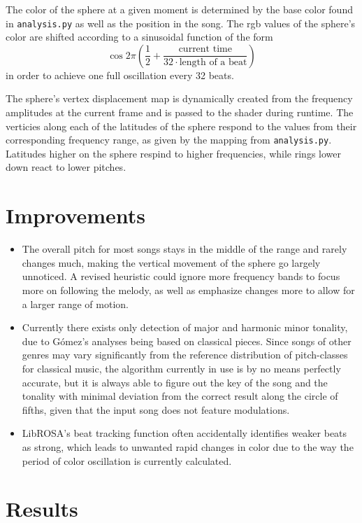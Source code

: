 \documentclass{article}
\newcommand{\code}{\texttt}
\begin{document}
The color of the sphere at a given moment is determined by the base color found in \code{analysis.py} as well as the position in the song. The rgb values of the sphere's color are shifted according to a sinusoidal function of the form
$$\cos 2 \pi \left( \frac{1}{2} + \frac{\text{current time}}{32 \cdot \text{length of a beat}} \right)$$
in order to achieve one full oscillation every 32 beats.

The sphere's vertex displacement map is dynamically created from the frequency amplitudes at the current frame and is passed to the shader during runtime. The verticies along each of the latitudes of the sphere respond to the values from their corresponding frequency range, as given by the mapping from \code{analysis.py}. Latitudes higher on the sphere respind to higher frequencies, while rings lower down react to lower pitches.

\section{Improvements}

\begin{itemize}
    \item The overall pitch for most songs stays in the middle of the range and rarely changes much, making the vertical movement of the sphere go largely unnoticed. A revised heuristic could ignore more frequency bands to focus more on following the melody, as well as emphasize changes more to allow for a larger range of motion.

    \item Currently there exists only detection of major and harmonic minor tonality, due to G\'{o}mez's \cite{gomez} analyses being based on classical pieces. Since songs of other genres may vary significantly from the reference distribution of pitch-classes for classical music, the algorithm currently in use is by no means perfectly accurate, but it is always able to figure out the key of the song and the tonality with minimal deviation from the correct result along the circle of fifths, given that the input song does not feature modulations.

    \item LibROSA's beat tracking function often accidentally identifies weaker beats as strong, which leads to unwanted rapid changes in color due to the way the period of color oscillation is currently calculated.
\end{itemize}

\section{Results}
\end{document}

